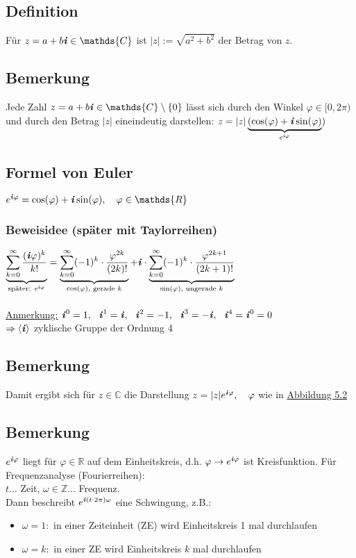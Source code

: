 \documentclass[12pt,titlepage, pdf]{article}
\newcommand{\R}{\mathds{R}}
\newcommand{\Z}{\mathds{Z}}
\newcommand{\C}{\mathds{C}}
\newcommand{\uline}[1]{\underline{#1}}
\renewcommand{\i}{\textbf{\textit{i}}}
\renewcommand{\>}{\rightarrow}
\renewcommand{\*}{\cdot}
\renewcommand{\phi}{\varphi}
\begin{document}
	\subsection{Definition}
	Für $z = a+b\i \in \C$ ist $|z| := \sqrt{a^2 + b^2}$ der Betrag von $z$.
	\subsection{Bemerkung}
	Jede Zahl $z = a+b\i \in \C \setminus \{0\} $ lässt sich durch den Winkel $\phi \in [0,2\pi)$ und durch den Betrag $|z|$ eineindeutig darstellen: 
	$z = |z|\underbrace{(\cos(\phi) + \i \sin(\phi)}_{e^{\i\phi}})$
	\subsection{Formel von Euler}
	\label{5.5}
	$e^{\i\phi} = \cos(\phi) + \i \sin(\phi),~~~ \phi \in \R$
	\subsubsection*{Beweisidee (später mit Taylorreihen)}
	$\underbrace{\sum_{k = 0}^{\infty} \frac{(\i\phi)^k}{k!}}_{\text{später: }e^{\i\phi}} = \underbrace{\sum_{k = 0}^{\infty}(-1)^k \cdot \frac{\phi^{2k}}{(2k)!}}_{\cos(\phi)\textrm{, gerade }k} + \i \cdot \underbrace{ \sum_{k = 0}^{\infty}(-1)^k \cdot \frac{\phi^{2k+1}}{(2k+1)!}}_{\sin(\phi)\textrm{, ungerade }k}$\\
	\\
	\uline{Anmerkung:} $\i^0 = 1,~~ \i^1 = \i,~~ \i^2 = -1,~~ \i^3 = -\i,~~ \i^4 = \i^0 = 0$\\
	$\Rightarrow \langle \i \rangle$ zyklische Gruppe der Ordnung 4
	\subsection{Bemerkung}
	Damit ergibt sich für $z \in \C$ die Darstellung $z = |z| e^{\i\phi},~~~ \phi$ wie in \hyperref[5.2]{Abbildung 5.2}
	\subsection{Bemerkung}
	$e^{\i\phi}$ liegt für $\phi \in \R$ auf dem Einheitskreis, d.h. $\phi \rightarrow e^{\i\phi}$ ist Kreisfunktion. Für Frequenzanalyse (Fourierreihen): \\
	$t$... Zeit, $\omega \in \Z$... Frequenz. \\
	Dann beschreibt $e^{\i(t \cdot 2\pi) \omega}$ eine Schwingung, z.B.:
	\begin{itemize}
		\item $\omega = 1:$ in einer Zeiteinheit (ZE) wird Einheitskreis 1 mal durchlaufen
		\item $\omega = k:$ in einer ZE wird Einheitskreis $k$ mal durchlaufen
	\end{itemize}
\end{document}
